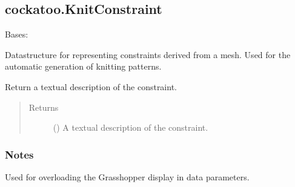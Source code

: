 \documentclass[letterpaper,10pt,english]{sphinxmanual}
\begin{document}
\subsection{cockatoo.KnitConstraint}
\label{\detokenize{cockatoo:cockatoo-knitconstraint}}

\begin{fulllineitems}
\label{\detokenize{cockatoo:cockatoo.KnitConstraint}}
Bases: %
\begin{footnote}[68]\sphinxAtStartFootnote
{}
%
\end{footnote}

Datastructure for representing constraints derived from a mesh. Used for
the automatic generation of knitting patterns.

\begin{fulllineitems}
\label{\detokenize{cockatoo:cockatoo.KnitConstraint.ToString}}
Return a textual description of the constraint.
\begin{quote}\begin{description}
\item[{Returns}] \leavevmode
{} () \textendash{} A textual description of the constraint.

\end{description}\end{quote}
\subsubsection*{Notes}

Used for overloading the Grasshopper display in data parameters.

\end{fulllineitems}



\end{fulllineitems}
\end{document}
